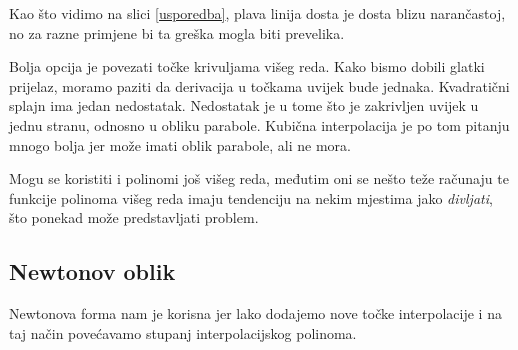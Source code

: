 \documentclass[12pt,a4paper]{report}
\begin{document}
	Kao što vidimo na slici \ref{usporedba}, plava linija dosta je dosta blizu narančastoj, no za razne primjene bi ta greška mogla biti prevelika.
	
	Bolja opcija je povezati točke krivuljama višeg reda. Kako bismo dobili glatki prijelaz, moramo paziti da derivacija u točkama uvijek bude jednaka. Kvadratični splajn ima jedan nedostatak. Nedostatak je u tome što je zakrivljen uvijek u jednu stranu, odnosno u obliku parabole. Kubična interpolacija je po tom pitanju mnogo bolja jer može imati oblik parabole, ali ne mora\cite{SteigerPrez}. 
	
	Mogu se koristiti i polinomi još višeg reda, međutim oni se nešto teže računaju te funkcije polinoma višeg reda imaju tendenciju na nekim mjestima jako \textit{divljati}, što ponekad može predstavljati problem\cite{ChEn2450}.
	\subsection{Newtonov oblik}
	Newtonova forma\cite{hari} nam je korisna jer lako dodajemo nove točke interpolacije i na taj način povećavamo stupanj interpolacijskog polinoma. 
	
\end{document}
